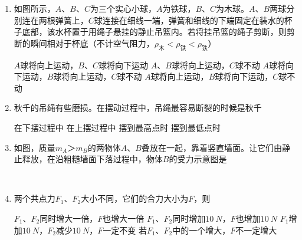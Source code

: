 

\begin{enumerate}[leftmargin=0em]
\renewcommand{\labelenumi}{\arabic{enumi}.}
\item
{}
如图所示，$ A $、$ B $、$ C $为三个实心小球，$ A $为铁球，$ B $、$ C $为木球。$ A $、$ B $两球分别连在两根弹簧上，$ C $球连接在细线一端，弹簧和细线的下端固定在装水的杯子底部，该水杯置于用绳子悬挂的静止吊篮内。若将挂吊篮的绳子剪断，则剪断的瞬间相对于杯底（不计空气阻力，$ \rho_{ \text{木} } < \rho_{ \text{铁} } < \rho_{ \text{铁} } $）  
\begin{figure}[h!]
\centering

\end{figure}



\fourchoices
{$ A $球将向上运动，$ B $、$ C $球将向下运动}
{$ A $、$ B $球将向上运动，$ C $球不动}
{$ A $球将向下运动，$ B $球将向上运动，$ C $球不动}
{$ A $球将向上运动，$ B $球将向下运动，$ C $球不动}


\item 
{}
秋千的吊绳有些磨损。在摆动过程中，吊绳最容易断裂的时候是秋千  

\fourchoices
{在下摆过程中}
{在上摆过程中}
{摆到最高点时}
{摆到最低点时}

\item
{}
如图，质量$ m_A ＞ m_B $的两物体$ A $、$ B $叠放在一起，靠着竖直墙面。让它们由静止释放，在沿粗糙墙面下落过程中，物体$ B $的受力示意图是  
\begin{figure}[h!]
\centering
\\

\end{figure}


\item 
{}
两个共点力$ F_{1} $、$ F_{2} $大小不同，它们的合力大小为$ F $，则  


\fourchoices
{$ F_{1} $、$ F_{2} $同时增大一倍，$ F $也增大一倍 }
{$ F_{1} $、$ F_{2} $同时增加$ 10 \ N $，$ F $也增加$ 10 \ N $}
{$ F_{1} $增加$ 10 \ N $，$ F_{2} $减少$ 10 \ N $，$ F $一定不变}
{若$ F_{1} $、$ F_{2} $中的一个增大，$ F $不一定增大}


\end{enumerate}
